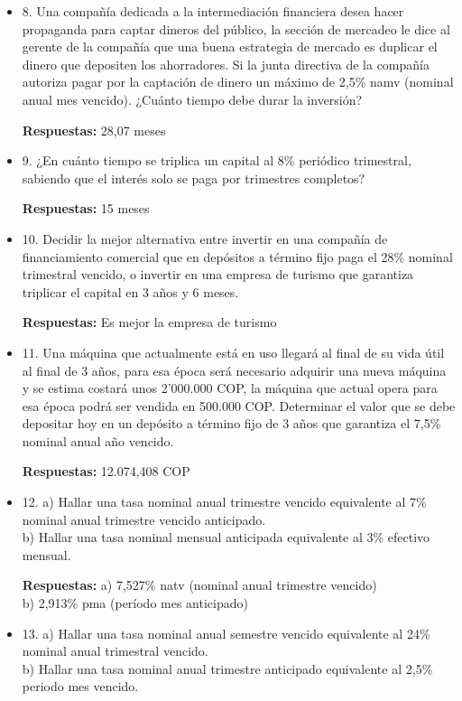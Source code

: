 \begin{itemize}
 \item 8. Una compañía dedicada a la intermediación financiera desea hacer propaganda para captar dineros del público, la sección de mercadeo le dice al gerente de la compañía que una buena estrategia de mercado es duplicar el dinero que depositen los ahorradores. Si la junta directiva de la compañía autoriza pagar por la captación de dinero un máximo de 2,5\% namv (nominal anual mes vencido). ¿Cuánto tiempo debe durar la inversión? 
 
       \textbf{Respuestas:} 28,07 meses
       \medskip

 \item 9. ¿En cuánto tiempo se triplica un capital al 8\% periódico trimestral, sabiendo que el interés solo se paga por trimestres completos?
 
       \textbf{Respuestas:} 15 meses
       \medskip

 \item 10. Decidir la mejor alternativa entre invertir en una compañía de financiamiento comercial que en depósitos a término fijo paga el 28\% nominal trimestral vencido, o invertir en una empresa de turismo que garantiza triplicar el capital en 3 años y 6 meses.
 
       \textbf{Respuestas:} Es mejor la empresa de turismo
       \medskip

 \item 11. Una máquina que actualmente está en uso llegará al final de su vida útil  al final de 3 años, para esa época será necesario adquirir una nueva máquina y se estima costará unos 2’000.000 COP, la máquina que actual opera para esa época podrá ser vendida en 500.000 COP. Determinar el  valor que se debe depositar hoy en un depósito a término fijo de 3 años que garantiza el 7,5\% nominal anual año vencido.
 
  \textbf{Respuestas:}  12.074,408 COP
       \medskip

 \item 12. a) Hallar una tasa nominal anual trimestre vencido equivalente al 7\% nominal anual trimestre vencido anticipado.\\
 b) Hallar una tasa nominal mensual anticipada equivalente al 3\% efectivo mensual.
 
       \textbf{Respuestas:} a) 7,527\%  natv (nominal anual trimestre vencido)\\
       b) 2,913\% pma (período mes anticipado)\\ 
       \medskip

 \item 13. a) Hallar una tasa nominal anual semestre vencido equivalente al 24\% nominal anual trimestral vencido.\\
 b) Hallar una tasa nominal anual trimestre anticipado equivalente al 2,5\% periodo mes vencido.
 

\end{itemize}
